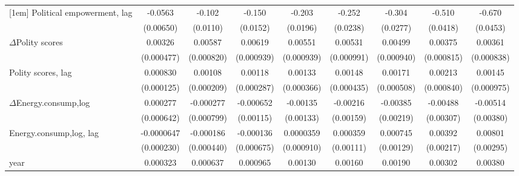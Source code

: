 \begin{table}[htbp]
\begin{tabular}{l*{8}{c}}
[1em]
Political empowerment, lag   &     -0.0563\sym{***}&      -0.102\sym{***}&      -0.150\sym{***}&      -0.203\sym{***}&      -0.252\sym{***}&      -0.304\sym{***}&      -0.510\sym{***}&      -0.670\sym{***}\\
                    &   (0.00650)         &    (0.0110)         &    (0.0152)         &    (0.0196)         &    (0.0238)         &    (0.0277)         &    (0.0418)         &    (0.0453)         \\
[1em]
$\Delta$Polity scores          &     0.00326\sym{***}&     0.00587\sym{***}&     0.00619\sym{***}&     0.00551\sym{***}&     0.00531\sym{***}&     0.00499\sym{***}&     0.00375\sym{***}&     0.00361\sym{***}\\
                    &  (0.000477)         &  (0.000820)         &  (0.000939)         &  (0.000939)         &  (0.000991)         &  (0.000940)         &  (0.000815)         &  (0.000838)         \\
[1em]
Polity scores, lag            &    0.000830\sym{***}&     0.00108\sym{***}&     0.00118\sym{***}&     0.00133\sym{***}&     0.00148\sym{***}&     0.00171\sym{***}&     0.00213\sym{**} &     0.00145         \\
                    &  (0.000125)         &  (0.000209)         &  (0.000287)         &  (0.000366)         &  (0.000435)         &  (0.000508)         &  (0.000840)         &  (0.000975)         \\
[1em]
$\Delta$Energy.consump,log            &    0.000277         &   -0.000277         &   -0.000652         &    -0.00135         &    -0.00216         &    -0.00385\sym{*}  &    -0.00488         &    -0.00514         \\
                    &  (0.000642)         &  (0.000799)         &   (0.00115)         &   (0.00133)         &   (0.00159)         &   (0.00219)         &   (0.00307)         &   (0.00380)         \\
[1em]
Energy.consump,log, lag           &  -0.0000647         &   -0.000186         &   -0.000136         &   0.0000359         &    0.000359         &    0.000745         &     0.00392\sym{*}  &     0.00801\sym{***}\\
                    &  (0.000230)         &  (0.000440)         &  (0.000675)         &  (0.000910)         &   (0.00111)         &   (0.00129)         &   (0.00217)         &   (0.00295)         \\
[1em]
year                &    0.000323\sym{***}&    0.000637\sym{***}&    0.000965\sym{***}&     0.00130\sym{***}&     0.00160\sym{***}&     0.00190\sym{***}&     0.00302\sym{***}&     0.00380\sym{***}\\

\end{tabular}
\end{table}
